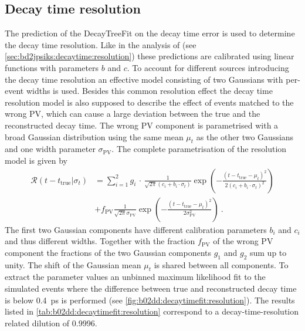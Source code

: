 \subsection{Decay time resolution}
\label{sec:b02dd:decaytimefit:resolution}

The prediction of the DecayTreeFit on the decay time error is used to determine the
decay time resolution. Like in the analysis of \BdToJPsiKS (see
\cref{sec:bd2jpsiks:decaytime:resolution}) these predictions are calibrated
using linear functions with parameters $b$ and $c$. To account for different sources
introducing the decay time resolution an effective model consisting of two
Gaussians with per-event widths is used. Besides this common resolution effect
the decay time resolution model is also supposed to describe the effect of
events matched to the wrong PV, which can cause a large deviation between the
true and the reconstructed decay time. The wrong PV component is
parametrised with a broad Gaussian distribution using the same mean $\mu_t$ as
the other two Gaussians and one width parameter $\sigma_{\text{PV}}$. The
complete parametrisation of the resolution model is given by
%
\begin{equation}
\begin{split}
  {\mathcal{R}}(t-t_\text{true}|\sigma_t) &= \sum_{i=1}^{2}{g_i\,\cdot\,\frac{1}{\sqrt{2\pi}(c_i + b_i \cdot \sigma_t)}\exp\left(-\frac{(t - t_\text{true} - \mu_t)^2}{2(c_i + b_i \cdot \sigma_t)^2}\right)}\\
  &+ f_{\text{PV}} \frac{1}{\sqrt{2\pi} \sigma_{\text{PV}}} \exp\left(-\frac{(t - t_\text{true} - \mu_t)^2}{2 \sigma_{\text{PV}}^2}\right) \ .
\label{eq:b02dd:decaytimefit:resolution}
\end{split}
\end{equation}
%
The first two Gaussian components have different calibration parameters $b_i$
and $c_i$ and thus different widths. Together with the fraction $f_\text{PV}$
of the wrong PV component the fractions of the two Gaussian components $g_1$
and $g_2$ sum up to unity. The shift of the Gaussian mean $\mu_t$ is shared
between all components. To extract the parameter values an unbinned maximum
likelihood fit to the simulated events where the difference between true and
reconstructed decay time is below \SI{0.4}{\ps} is performed (see
\cref{fig:b02dd:decaytimefit:resolution}). The results listed in
\cref{tab:b02dd:decaytimefit:resolution} correspond to a decay-time-resolution
related dilution of \num{0.9996}.
%
